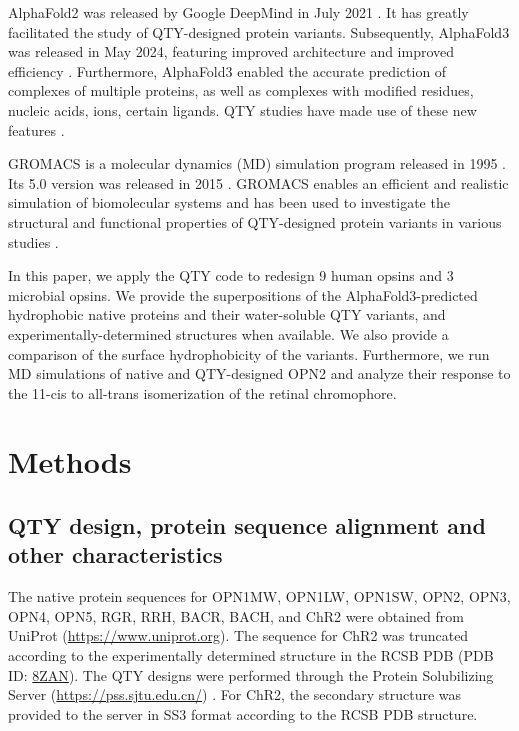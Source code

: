 \documentclass[fleqn, 10pt, lineno]{manuscript}
\begin{document}
AlphaFold2 was released by Google DeepMind in July 2021 \citep{Jumper_2021}. It has greatly facilitated the study of QTY-designed protein variants. Subsequently, AlphaFold3 was released in May 2024, featuring improved architecture and improved efficiency \citep{Abramson_2024}. Furthermore, AlphaFold3 enabled the accurate prediction of complexes of multiple proteins, as well as complexes with modified residues, nucleic acids, ions, certain ligands. QTY studies have made use of these new features \citep{Chen_2025, Johnsson_2025}. 

GROMACS is a molecular dynamics (MD) simulation program released in 1995 \citep{Berendsen_1995}. Its 5.0 version was released in 2015 \citep{Abraham_2015}. GROMACS enables an efficient and realistic simulation of biomolecular systems and has been used to investigate the structural and functional properties of QTY-designed protein variants in various studies \citep{Karagol_2024, Li_Tang_2024, Smorodina_2024, Li_Wang_2024, Johnsson_2025}. 

In this paper, we apply the QTY code to redesign 9 human opsins and 3 microbial opsins. We provide the superpositions of the AlphaFold3-predicted hydrophobic native proteins and their water-soluble QTY variants, and experimentally-determined structures when available. We also provide a comparison of the surface hydrophobicity of the variants. Furthermore, we run MD simulations of native and QTY-designed OPN2 and analyze their response to the 11-cis to all-trans isomerization of the retinal chromophore. 

\section*{Methods}

\subsection*{QTY design, protein sequence alignment and other characteristics}

The native protein sequences for OPN1MW, OPN1LW, OPN1SW, OPN2, OPN3, OPN4, OPN5, RGR, RRH, BACR, BACH, and ChR2 were obtained from UniProt (\url{https://www.uniprot.org}). The sequence for ChR2 was truncated according to the experimentally determined structure in the RCSB PDB (PDB ID: \href{https://www.rcsb.org/structure/8ZAN}{8ZAN}). The QTY designs were performed through the Protein Solubilizing Server (\url{https://pss.sjtu.edu.cn/}) \citep{Tao_2022}. For ChR2, the secondary structure was provided to the server in SS3 format according to the RCSB PDB structure. 
\end{document}
